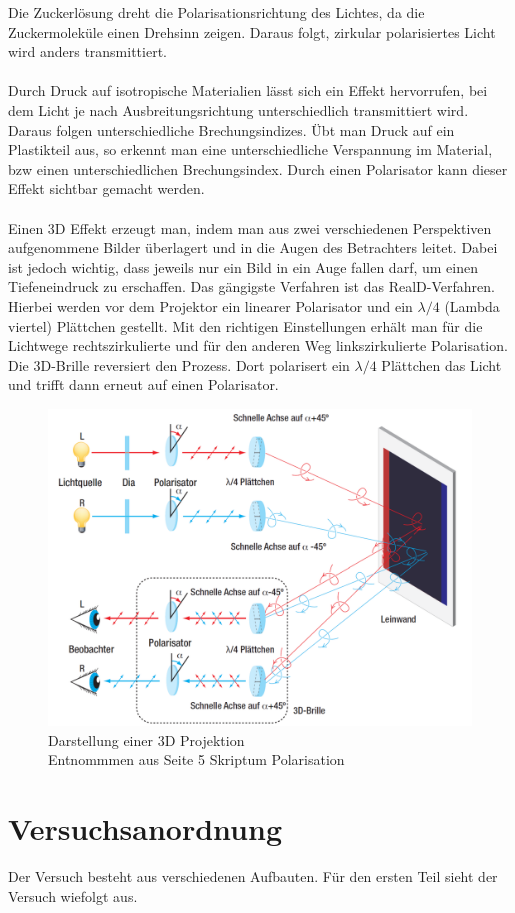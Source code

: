 \documentclass[12pt,a4paper,twoside]{article}
\begin{document}
\noindent
Die Zuckerlösung dreht die Polarisationsrichtung des Lichtes, da die Zuckermoleküle einen Drehsinn zeigen. 
Daraus folgt, zirkular polarisiertes Licht wird anders transmittiert. 
\\
\\
Durch Druck auf isotropische Materialien lässt sich ein Effekt hervorrufen, bei dem Licht je nach Ausbreitungsrichtung unterschiedlich transmittiert wird. Daraus folgen unterschiedliche Brechungsindizes. 
Übt man Druck auf ein Plastikteil aus, so erkennt man eine unterschiedliche Verspannung im Material, bzw einen unterschiedlichen Brechungsindex. 
Durch einen Polarisator kann dieser Effekt sichtbar gemacht werden. 
\\
\\
Einen 3D Effekt erzeugt man, indem man aus zwei verschiedenen Perspektiven aufgenommene Bilder überlagert und in die Augen des Betrachters leitet. 
Dabei ist jedoch wichtig, dass jeweils nur ein Bild in ein Auge fallen darf, um einen Tiefeneindruck zu erschaffen. 
Das gängigste Verfahren ist das RealD-Verfahren. Hierbei werden vor dem Projektor ein linearer Polarisator und ein $\lambda/4$ (Lambda viertel) Plättchen gestellt. 
Mit den richtigen Einstellungen erhält man für die Lichtwege rechtszirkulierte und für den anderen Weg linkszirkulierte Polarisation. \\
Die 3D-Brille reversiert den Prozess. Dort polarisert ein $\lambda/4$ Plättchen das Licht und trifft dann erneut auf einen Polarisator. 

\begin{figure}[H]
    \centering
    \includegraphics[width=0.6\linewidth]{nudes/3D.png}
    \caption{Darstellung einer 3D Projektion \\ Entnommmen aus Seite 5 Skriptum Polarisation \cite{teachcenter2}}
    \label{fig:3D Projektion schema}
\end{figure}

\section{Versuchsanordnung} %
Der Versuch besteht aus verschiedenen Aufbauten. Für den ersten Teil sieht der Versuch wiefolgt aus. 
\end{document}
